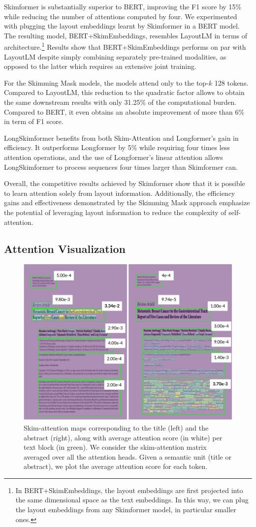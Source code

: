 Skimformer is substantially superior to \ac{BERT}, improving the F1 score by 15\% while reducing the number of attentions computed by four. We experimented with plugging the layout embeddings learnt by Skimformer in a \ac{BERT} model. The resulting model, BERT+SkimEmbeddings, resembles LayoutLM in terms of architecture.\footnote{In BERT+SkimEmbeddings, the layout embeddings are first projected into the same dimensional space as the text embeddings. In this way, we can plug the layout embeddings from any Skimformer model, in particular smaller ones.} Results show that BERT+SkimEmbeddings performs on par with LayoutLM despite simply combining separately pre-trained modalities, as opposed to the latter which requires an extensive joint training.

For the Skimming Mask models, the models attend only to the top-$k$ 128 tokens. Compared to LayoutLM, this reduction to the quadratic factor allows to obtain the same downstream results with only 31.25\% of the computational burden.
Compared to \ac{BERT}, it even obtains an absolute improvement of more than 6\% in term of F1 score.

LongSkimformer benefits from both Skim-Attention and Longformer's gain in efficiency. It outperforms Longformer by 5\% while requiring four times less attention operations, and the use of Longformer's linear attention allows LongSkimformer to process sequences four times larger than Skimformer can.

Overall, the competitive results achieved by Skimformer show that it is possible to learn attention solely from layout information. Additionally, the efficiency gains and effectiveness demonstrated by the Skimming Mask approach emphasize the potential of leveraging layout information to reduce the complexity of self-attention.

\subsection{Attention Visualization}
\label{subsection:attention-visualization}

\begin{figure}
    \centering \small
    \includegraphics[width=.49\textwidth]{images/chapter3/attention-maps_with-average.pdf}
    \caption{Skim-attention maps corresponding to the title (left) and the abstract (right), along with average attention score (in white) per text block (in green). We consider the skim-attention matrix averaged over all the attention heads. Given a semantic unit (title or abstract), we plot the average attention score for each token.
    }
    \label{fig:attention-vis}
\end{figure}

